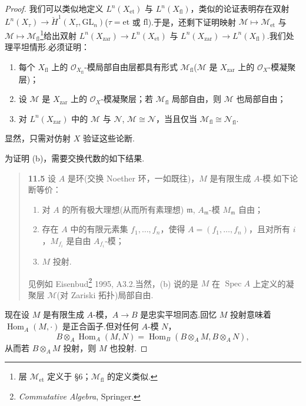 \begin{proof}
我们可以类似地定义 $L^{n}(X_{\mathrm{et}})$ 与 $L^{n}(X_{\mathrm{fl}})$，类似的论证表明存在双射 $L^{n}(X_{\tau}) \to \check{H}^{1}(X_{\tau}, \mathrm{GL}_n)$($\tau = \mathrm{et}$ 或 $\mathrm{fl}$).于是，还剩下证明映射 $\mathcal{M} \mapsto \mathcal{M}_{\mathrm{et}}$ 与 $\mathcal{M} \mapsto \mathcal{M}_{\mathrm{fl}}$\footnote{层 $\mathcal{M}_{\mathrm{et}}$ 定义于 \S 6；$\mathcal{M}_{\mathrm{fl}}$ 的定义类似.}给出双射 $L^{n}(X_{\mathrm{zar}}) \to L^{n}(X_{\mathrm{et}})$ 与 $L^{n}(X_{\mathrm{zar}}) \to L^{n}(X_{\mathrm{fl}})$.我们处理平坦情形.必须证明：
\begin{enumerate}
  \item 每个 $X_{\mathrm{fl}}$ 上的 $\mathcal{O}_{X_{\mathrm{fl}}}$-模局部自由层都具有形式 $\mathcal{M}_{\mathrm{fl}}$($\mathcal{M}$ 是 $X_{\mathrm{zar}}$ 上的 $\mathcal{O}_X$-模凝聚层)；
  \item 设 $\mathcal{M}$ 是 $X_{\mathrm{zar}}$ 上的 $\mathcal{O}_X$-模凝聚层；若 $\mathcal{M}_{\mathrm{fl}}$ 局部自由，则 $\mathcal{M}$ 也局部自由；
  \item 对 $L^{n}(X_{\mathrm{zar}})$ 中的 $\mathcal{M}$ 与 $\mathcal{N}$, $\mathcal{M} \cong \mathcal{N}$，当且仅当 $\mathcal{M}_{\mathrm{fl}} \cong \mathcal{N}_{\mathrm{fl}}$.
\end{enumerate}
显然，只需对仿射 $X$ 验证这些论断.

为证明 (b)，需要交换代数的如下结果.

\begin{quote}
\label{item:11.5}
\textbf{11.5} 设 $A$ 是环(交换 Noether 环，一如既往)，$M$ 是有限生成 $A$-模.如下论断等价：
\begin{enumerate}
  \item 对 $A$ 的所有极大理想(从而所有素理想) $\mathfrak{m}$, $A_{\mathfrak{m}}$-模 $M_{\mathfrak{m}}$ 自由；
  \item 存在 $A$ 中的有限元素集 $f_1, \ldots, f_n$，使得 $A = (f_1, \ldots, f_n)$，且对所有 $i$，$M_{f_i}$ 是自由 $A_{f_i}$-模；
  \item $M$ 投射.
\end{enumerate}
见例如 Eisenbud\footnote{\emph{Commutative Algebra}, Springer.} 1995, A3.2.当然，(b) 说的是 $M$ 在 $\operatorname{Spec} A$ 上定义的凝聚层 $\mathcal{M}$(对 Zariski 拓扑)局部自由.
\end{quote}

现在设 $M$ 是有限生成 $A$-模，$A \to B$ 是忠实平坦同态.回忆 $M$ 投射意味着 $\operatorname{Hom}_A(M, \cdot)$ 是正合函子.但对任何 $A$-模 $N$，
\[
B \otimes_{A} \operatorname{Hom}_A(M, N) = \operatorname{Hom}_B(B \otimes_{A} M, B \otimes_{A} N),
\]
从而若 $B \otimes_{A} M$ 投射，则 $M$ 也投射.


\end{proof}
